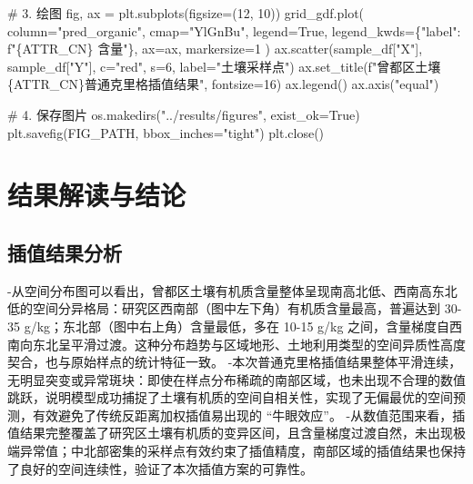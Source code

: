 \documentclass[
  letterpaper,
  DIV=11,
  numbers=noendperiod]{scrreprt}
\newenvironment{Shaded}{\begin{snugshade}}{\end{snugshade}}
\newcommand{\CommentTok}[1]{\textcolor[rgb]{0.37,0.37,0.37}{#1}}
\newcommand{\DecValTok}[1]{\textcolor[rgb]{0.68,0.00,0.00}{#1}}
\newcommand{\NormalTok}[1]{\textcolor[rgb]{0.00,0.23,0.31}{#1}}
\newcommand{\OperatorTok}[1]{\textcolor[rgb]{0.37,0.37,0.37}{#1}}
\newcommand{\SpecialCharTok}[1]{\textcolor[rgb]{0.37,0.37,0.37}{#1}}
\newcommand{\SpecialStringTok}[1]{\textcolor[rgb]{0.13,0.47,0.30}{#1}}
\newcommand{\StringTok}[1]{\textcolor[rgb]{0.13,0.47,0.30}{#1}}
\newcommand{\VariableTok}[1]{\textcolor[rgb]{0.07,0.07,0.07}{#1}}
\begin{document}
\begin{Shaded}
\begin{Highlighting}[]
    \CommentTok{\# 3. 绘图}
\NormalTok{    fig, ax }\OperatorTok{=}\NormalTok{ plt.subplots(figsize}\OperatorTok{=}\NormalTok{(}\DecValTok{12}\NormalTok{, }\DecValTok{10}\NormalTok{))}
\NormalTok{    grid\_gdf.plot(}
\NormalTok{        column}\OperatorTok{=}\StringTok{"pred\_organic"}\NormalTok{,}
\NormalTok{        cmap}\OperatorTok{=}\StringTok{"YlGnBu"}\NormalTok{,}
\NormalTok{        legend}\OperatorTok{=}\VariableTok{True}\NormalTok{,}
\NormalTok{        legend\_kwds}\OperatorTok{=}\NormalTok{\{}\StringTok{"label"}\NormalTok{: }\SpecialStringTok{f"}\SpecialCharTok{\{}\NormalTok{ATTR\_CN}\SpecialCharTok{\}}\SpecialStringTok{ 含量"}\NormalTok{\},}
\NormalTok{        ax}\OperatorTok{=}\NormalTok{ax,}
\NormalTok{        markersize}\OperatorTok{=}\DecValTok{1}
\NormalTok{    )}
\NormalTok{    ax.scatter(sample\_df[}\StringTok{"X"}\NormalTok{], sample\_df[}\StringTok{"Y"}\NormalTok{], c}\OperatorTok{=}\StringTok{"red"}\NormalTok{, s}\OperatorTok{=}\DecValTok{6}\NormalTok{, label}\OperatorTok{=}\StringTok{"土壤采样点"}\NormalTok{)}
\NormalTok{    ax.set\_title(}\SpecialStringTok{f"曾都区土壤}\SpecialCharTok{\{}\NormalTok{ATTR\_CN}\SpecialCharTok{\}}\SpecialStringTok{普通克里格插值结果"}\NormalTok{, fontsize}\OperatorTok{=}\DecValTok{16}\NormalTok{)}
\NormalTok{    ax.legend()}
\NormalTok{    ax.axis(}\StringTok{"equal"}\NormalTok{)}

    \CommentTok{\# 4. 保存图片}
\NormalTok{    os.makedirs(}\StringTok{"../results/figures"}\NormalTok{, exist\_ok}\OperatorTok{=}\VariableTok{True}\NormalTok{)}
\NormalTok{    plt.savefig(FIG\_PATH, bbox\_inches}\OperatorTok{=}\StringTok{"tight"}\NormalTok{)}
\NormalTok{    plt.close()}
\end{Highlighting}
\end{Shaded}


\chapter{结果解读与结论}\label{ux7ed3ux679cux89e3ux8bfbux4e0eux7ed3ux8bba}

\section{插值结果分析}\label{ux63d2ux503cux7ed3ux679cux5206ux6790}

-从空间分布图可以看出，曾都区土壤有机质含量整体呈现南高北低、西南高东北低的空间分异格局：研究区西南部（图中左下角）有机质含量最高，普遍达到
30-35 g/kg；东北部（图中右上角）含量最低，多在 10-15 g/kg
之间，含量梯度自西南向东北呈平滑过渡。这种分布趋势与区域地形、土地利用类型的空间异质性高度契合，也与原始样点的统计特征一致。
-本次普通克里格插值结果整体平滑连续，无明显突变或异常斑块：即使在样点分布稀疏的南部区域，也未出现不合理的数值跳跃，说明模型成功捕捉了土壤有机质的空间自相关性，实现了无偏最优的空间预测，有效避免了传统反距离加权插值易出现的
``牛眼效应''。
-从数值范围来看，插值结果完整覆盖了研究区土壤有机质的变异区间，且含量梯度过渡自然，未出现极端异常值；中北部密集的采样点有效约束了插值精度，南部区域的插值结果也保持了良好的空间连续性，验证了本次插值方案的可靠性。
\end{document}
